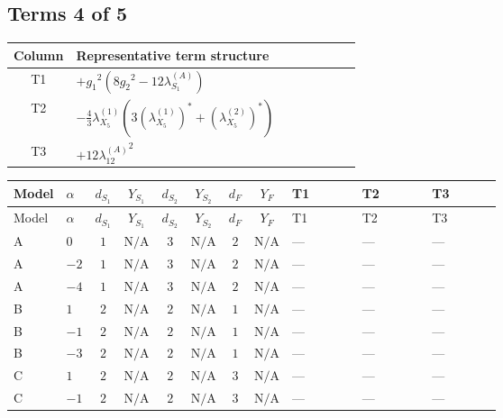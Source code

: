 \documentclass[8pt]{article}
\begin{document}
\begin{landscape}
\subsection*{Terms 4 of 5}
\begin{center}
\begin{tabular}{@{}c >{\raggedright\arraybackslash}p{0.82\linewidth}@{}}
\toprule
Column & Representative term structure \\
\midrule
T1 & \(\displaystyle +{g_1}^2 \left(8 {g_2}^2-12 {\lambda_{S_1}^{(A)}}\right)\) \\
\midrule
T2 & \(\displaystyle -\frac{4}{3} {\lambda_{X_{5}}^{(1)}} (3 \left({\lambda_{X_{5}}^{(1)}}\right)^{*}+\left({\lambda_{X_{5}}^{(2)}}\right)^{*})\) \\
\midrule
T3 & \(\displaystyle +12 {\lambda_{12}^{(A)}}^2\) \\
\midrule
\bottomrule
\end{tabular}
\end{center}
\smallskip
\tiny
\begin{longtable}{@{}llcccccc >{\raggedright\arraybackslash}p{0.21\linewidth} >{\raggedright\arraybackslash}p{0.21\linewidth} >{\raggedright\arraybackslash}p{0.21\linewidth}@{}}
\toprule
Model & $\alpha$ & $d_{S_1}$ & $Y_{S_1}$ & $d_{S_2}$ & $Y_{S_2}$ & $d_F$ & $Y_F$ & T1 & T2 & T3 \\
\midrule
\endfirsthead
\toprule
Model & $\alpha$ & $d_{S_1}$ & $Y_{S_1}$ & $d_{S_2}$ & $Y_{S_2}$ & $d_F$ & $Y_F$ & T1 & T2 & T3 \\
\midrule
\endhead
A & $0$ & $1$ & $\text{N/A}$ & $3$ & $\text{N/A}$ & $2$ & $\text{N/A}$ & --- & --- & --- \\
\midrule
A & $-2$ & $1$ & $\text{N/A}$ & $3$ & $\text{N/A}$ & $2$ & $\text{N/A}$ & --- & --- & --- \\
\midrule
A & $-4$ & $1$ & $\text{N/A}$ & $3$ & $\text{N/A}$ & $2$ & $\text{N/A}$ & --- & --- & --- \\
\midrule
B & $1$ & $2$ & $\text{N/A}$ & $2$ & $\text{N/A}$ & $1$ & $\text{N/A}$ & --- & --- & --- \\
\midrule
B & $-1$ & $2$ & $\text{N/A}$ & $2$ & $\text{N/A}$ & $1$ & $\text{N/A}$ & --- & --- & --- \\
\midrule
B & $-3$ & $2$ & $\text{N/A}$ & $2$ & $\text{N/A}$ & $1$ & $\text{N/A}$ & --- & --- & --- \\
\midrule
C & $1$ & $2$ & $\text{N/A}$ & $2$ & $\text{N/A}$ & $3$ & $\text{N/A}$ & --- & --- & --- \\
\midrule
C & $-1$ & $2$ & $\text{N/A}$ & $2$ & $\text{N/A}$ & $3$ & $\text{N/A}$ & --- & --- & --- \\

\end{longtable}
\end{landscape}
\end{document}
